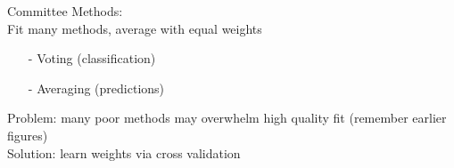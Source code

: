 \documentclass{beamer}
\numberwithin{equation}{section}
\begin{document}
\begin{frame}


Committee Methods:\\

Fit many methods, average with equal weights

\begin{itemize}
\item[-] Voting (classification)
\item[-] Averaging (predictions)
\end{itemize}


Problem: many poor methods may overwhelm high quality fit (remember earlier figures)\\
Solution: learn weights via cross validation


\end{frame}
\end{document}
